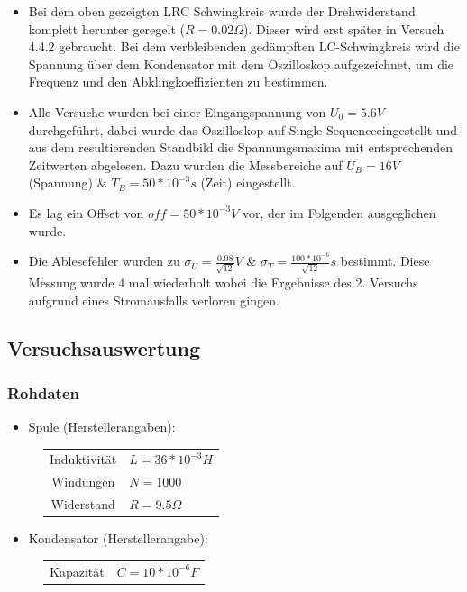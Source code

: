 \documentclass[12pt,a4paper]{article}
\begin{document}
\begin{itemize}
\item Bei dem oben gezeigten LRC Schwingkreis wurde der Drehwiderstand komplett herunter geregelt ($R=0.02\Omega$). Dieser wird erst später in Versuch 4.4.2 gebraucht. Bei dem verbleibenden gedämpften LC-Schwingkreis wird die Spannung über dem Kondensator mit dem Oszilloskop aufgezeichnet, um die Frequenz und den Abklingkoeffizienten zu bestimmen.  
\item Alle Versuche wurden bei einer Eingangspannung von $U_0=5.6V$ durchgeführt, dabei wurde das Oszilloskop auf \glqq Single Sequence\grqq eingestellt und aus dem resultierenden Standbild die Spannungsmaxima mit entsprechenden Zeitwerten abgelesen. Dazu wurden die Messbereiche auf $U_B=16V$ (Spannung) \& $T_B=50*10^{-3}s$ (Zeit) eingestellt.
\item Es lag ein Offset von $off=50*10^{-3}V$ vor, der im Folgenden ausgeglichen wurde.
\item Die Ablesefehler wurden zu $\sigma_U=\frac{0.08}{\sqrt{12}}V$ \& $\sigma_T=\frac{100*10^{-6}}{\sqrt{12}}s$ bestimmt.
Diese Messung wurde 4 mal wiederholt wobei die Ergebnisse des 2. Versuchs aufgrund eines Stromausfalls verloren gingen.
\end{itemize}

\newpage
\subsection{Versuchsauswertung}

\subsubsection{Rohdaten}
\begin{itemize}

\item Spule (Herstellerangaben):\centering
\end{itemize}
\begin{figure}[H]\centering
\begin{tabular}{c|l}
Induktivität & $L=36*10^{-3}H$\\ 
Windungen & $N=1000$\\ 
Widerstand & $R=9.5\Omega$ \\
\end{tabular} 
\end{figure}

\begin{itemize}
\item Kondensator (Herstellerangabe):\centering
\end{itemize}
\begin{figure}[H]\centering
\begin{tabular}{c|l}
Kapazität & $C=10*10^{-6}F$\\ 
\end{tabular} 
\end{figure}
\end{document}

